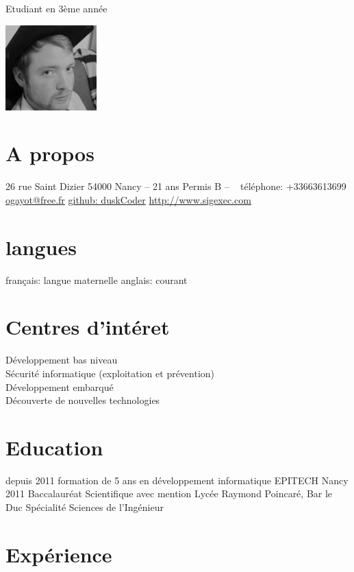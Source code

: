 \documentclass[]{friggeri-cv}
\begin{document}
       {Etudiant en 3ème année}


\begin{aside}
    \includegraphics[width=100pt]{photo.png}
  \section{A propos}
    26 rue Saint Dizier
    54000 Nancy
    --
    21 ans
    Permis B
    --
    ~
    téléphone: +33663613699
    \href{mailto:ogayot@free.fr}{ogayot@free.fr}
    \href{https://github.com/duskCoder}{github: duskCoder}
    \href{http://www.sigexec.com}{http://www.sigexec.com}
  \section{langues}
    français: langue maternelle
    anglais: courant
\end{aside}

\section{Centres d'intéret}

Développement bas niveau\\
Sécurité informatique (exploitation et prévention)\\
Développement embarqué\\
Découverte de nouvelles technologies

\section{Education}

\begin{entrylist}
  \entry
    {depuis 2011}
    {formation de 5 ans en développement informatique}
    {EPITECH Nancy}
    {}
  \entry
    {2011}
    {Baccalauréat Scientifique avec mention}
    {Lycée Raymond Poincaré, Bar le Duc}
    {Spécialité Sciences de l'Ingénieur}
\end{entrylist}

\section{Expérience}
\end{document}
